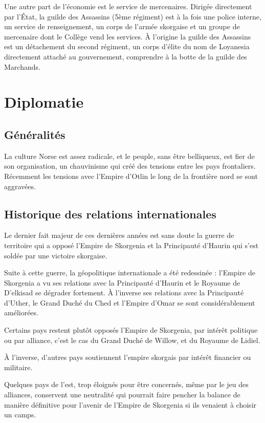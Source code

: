 \documentclass[french, a4paper, 12pt]{article}
\begin{document}
Une autre part de l'économie est le service de mercenaires. Dirigée directement par l'État, la guilde des Assassins (5ème régiment) est à la fois une police interne, un service de renseignement, un corps de l'armée skorgaise et un groupe de mercenaire dont le Collège vend les services. À l'origine la guilde des Assassins est un détachement du second régiment, un corps d'élite du nom de Loyanesia directement attaché au gouvernement, comprendre à la botte de la guilde des Marchands.

\section{Diplomatie}

\subsection{Généralités}

La culture Norse est assez radicale, et le peuple, sans être belliqueux, est fier de son organisation, un chauvinisme qui créé des tensions entre les pays frontaliers. Récemment les tensions avec l'Empire d'Otlin le long de la frontière nord se sont aggravées.

\subsection{Historique des relations internationales}

Le dernier fait majeur de ces dernières années est sans doute la guerre de territoire qui a opposé l'Empire de Skorgenia et la Principauté d'Haurin qui s'est soldée par une victoire skorgaise.

Suite à cette guerre, la géopolitique internationale a été redessinée : l'Empire de Skorgenia a vu ses relations avec la Principauté d'Haurin et le Royaume de D'elkisad se dégrader fortement. À l'inverse ses relations avec la Principauté d'Uther, le Grand Duché du Ched et l'Empire d'Omar se sont considérablement améliorées.

Certains pays restent plutôt opposés l'Empire de Skorgenia, par intérêt politique ou par alliance, c'est le cas du Grand Duché de Willow, et du Royaume de Lidiel.

À l'inverse, d'autres pays soutiennent l'empire skorgais par intérêt financier ou militaire.

Quelques pays de l'est, trop éloignés pour être concernés, même par le jeu des alliances, conservent une neutralité qui pourrait faire pencher la balance de manière définitive pour l'avenir de l'Empire de Skorgenia si ils venaient à choisir un camps.
\end{document}
